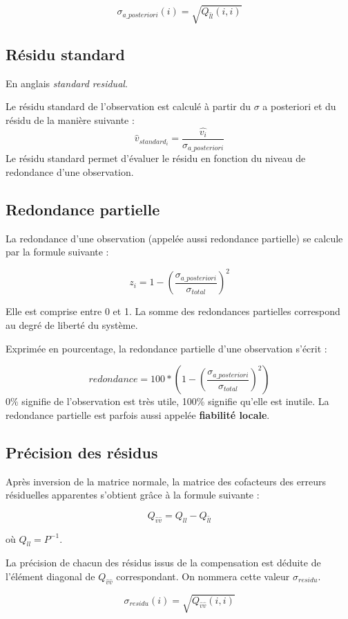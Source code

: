 \documentclass[french]{report}
\begin{document}
$$\sigma_{a\_posteriori}(i)=\sqrt{Q_{\hat{l}\hat{l}}(i,i)}$$


\subsection{Résidu standard}

En anglais \textit{standard residual}.

Le résidu standard de l'observation est calculé à partir du $\sigma$ a posteriori et du résidu de la manière suivante : $$\hat{v}_{standard_i}=\frac{\hat{v_i}}{\sigma_{a\_posteriori}}$$
Le résidu standard permet d'évaluer le résidu en fonction du niveau de redondance d'une observation.


\subsection{Redondance partielle}
La redondance d'une observation (appelée aussi redondance partielle) se calcule par la formule suivante :

$$z_i=1-\left(\frac{\sigma_{a\_posteriori}}{\sigma_{total}}\right)^2$$

Elle est comprise entre 0 et 1. La somme des redondances partielles correspond au degré de liberté du système.

Exprimée en pourcentage, la redondance partielle d'une observation s'écrit :

$$redondance = 100*\left(1-\left(\frac{\sigma_{a\_posteriori}}{\sigma_{total}}\right)^2\right)$$
0\% signifie de l'observation est très utile, 100\% signifie qu'elle est inutile.
La redondance partielle est parfois aussi appelée \textbf{fiabilité locale}.


\subsection{Précision des résidus}

Après inversion de la matrice normale, la matrice des cofacteurs des erreurs résiduelles apparentes s'obtient grâce à la formule suivante :

$$ Q_{\hat{v}\hat{v}} = Q_{ll} - Q_{\hat{l}\hat{l}}$$

où $Q_{ll} = P^{-1}$.

La précision de chacun des résidus issus de la compensation est déduite de l'élément diagonal de $ Q_{\hat{v}\hat{v}} $ correspondant. On nommera cette valeur
$\sigma_{residu}$.

$$\sigma_{residu}(i)=\sqrt{Q_{\hat{v}\hat{v}}(i,i)}$$
\end{document}
